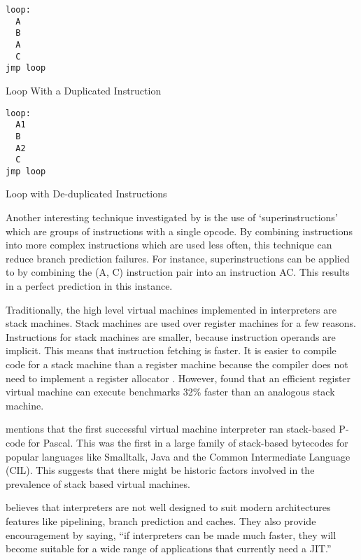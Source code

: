 		\begin{doublefig}
			\begin{halffig}
				\begin{lstlisting}
loop:
  A
  B
  A
  C
jmp loop
  				\end{lstlisting}
				\caption{Loop With a Duplicated Instruction}
				\label{fig:duplicatedinstructions}
			\end{halffig}
			\begin{halffig}
				\begin{lstlisting}
loop:
  A1
  B
  A2
  C
jmp loop
				\end{lstlisting}
				\caption{Loop with De-duplicated Instructions}
				\label{fig:deduplicatedinstructions}
			\end{halffig}
		\end{doublefig}
		
		
		
		Another interesting technique investigated by \citeauthor{optimizingindirectbranch} is the use of `superinstructions' which are groups of instructions with a single opcode. By combining instructions into more complex instructions which are used less often, this technique can reduce branch prediction failures. For instance, superinstructions can be applied to  by combining the (A, C) instruction pair into an instruction AC. This results in a perfect prediction in this instance.
		
		Traditionally, the high level virtual machines implemented in interpreters are stack machines. Stack machines are used over register machines for a few reasons. Instructions for stack machines are smaller, because instruction operands are implicit. This means that instruction fetching is faster. It is easier to compile code for a stack machine than a register machine because the compiler does not need to implement a register allocator \citep{caseregistervm}. However, \cite{stackregistershowdown} found that an efficient register virtual machine can execute benchmarks 32\% faster than an analogous stack machine. 
		
		\cite{caseregistervm} mentions that the first successful virtual machine interpreter ran stack-based P-code for Pascal. This was the first in a large family of stack-based bytecodes for popular languages like Smalltalk, Java and the Common Intermediate Language (CIL). This suggests that there might be historic factors involved in the prevalence of stack based virtual machines.
		
		\cite{fastjava} believes that interpreters are not well designed to suit modern architectures features like pipelining, branch prediction and caches. They also provide encouragement by saying, ``if interpreters can be made much faster, they will become suitable for a wide range of applications that currently need a JIT.''
		
